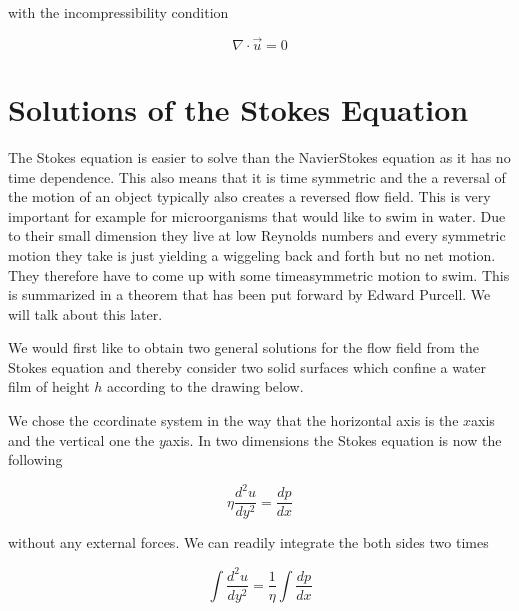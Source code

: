 \documentclass[letterpaper,10pt,english]{sphinxmanual}
\let\sphinxpxdimen\pdfpxdimen\else\newdimen\sphinxpxdimen
\begin{document}
\sphinxAtStartPar
with the incompressibility condition

\sphinxAtStartPar
\begin{equation}
\nabla \cdot \vec{u}=0
\end{equation}


\section{Solutions of the Stokes Equation}
\label{\detokenize{notebooks/L18/1_Reynolds_Number:Solutions-of-the-Stokes-Equation}}
\sphinxAtStartPar
The Stokes equation is easier to solve than the Navier\sphinxhyphen{}Stokes equation as it has no time dependence. This also means that it is time symmetric and the a reversal of the motion of an object typically also creates a reversed flow field. This is very important for example for micro\sphinxhyphen{}organisms that would like to swim in water. Due to their small dimension they live at low Reynolds numbers and every symmetric motion they take is just yielding a wiggeling back and forth but no net motion. They
therefore have to come up with some time\sphinxhyphen{}asymmetric motion to swim. This is summarized in a theorem that has been put forward by Edward Purcell. We will talk about this later.

\sphinxAtStartPar
We would first like to obtain two general solutions for the flow field from the Stokes equation and thereby consider two solid surfaces which confine a water film of height \(h\) according to the drawing below.

\noindent\sphinxincludegraphics[width=632\sphinxpxdimen,height=254\sphinxpxdimen]{{flow_field}.png}

\sphinxAtStartPar
We chose the ccordinate system in the way that the horizontal axis is the \(x\)\sphinxhyphen{}axis and the vertical one the \(y\)\sphinxhyphen{}axis. In two dimensions the Stokes equation is now the following

\sphinxAtStartPar
\begin{equation}
\eta \frac{d^2 u}{d y^2 }=\frac{dp}{dx}
\end{equation}

\sphinxAtStartPar
without any external forces. We can readily integrate the both sides two times

\sphinxAtStartPar
\begin{equation}
\int\frac{d^2 u}{d y^2 }=\frac{1}{\eta}\int \frac{dp}{dx}
\end{equation}
\end{document}
